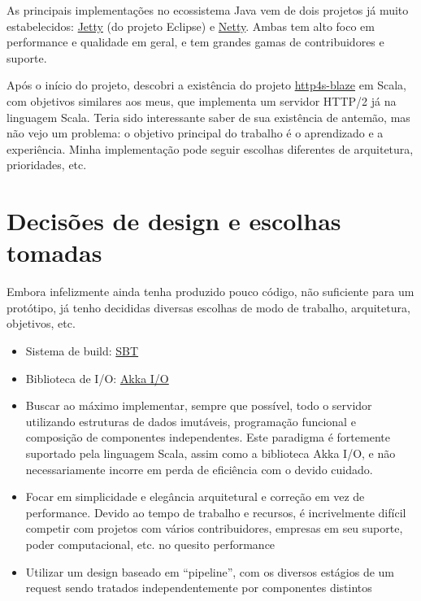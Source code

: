 \documentclass[12pt,a4paper,openright,twoside,]{abntex2}	%
\begin{document}
As principais implementações no ecossistema Java vem de dois projetos já
muito estabelecidos: \href{http://eclipse.org/jetty}{Jetty} (do projeto
Eclipse) e \href{http://netty.io}{Netty}. Ambas tem alto foco em
performance e qualidade em geral, e tem grandes gamas de contribuidores
e suporte.

Após o início do projeto, descobri a existência do projeto
\href{https://github.com/http4s/blaze}{http4s-blaze} em Scala, com
objetivos similares aos meus, que implementa um servidor HTTP/2 já na
linguagem Scala. Teria sido interessante saber de sua existência de
antemão, mas não vejo um problema: o objetivo principal do trabalho é o
aprendizado e a experiência. Minha implementação pode seguir escolhas
diferentes de arquitetura, prioridades, etc.

\section{Decisões de design e escolhas
tomadas}\label{decisuxf5es-de-design-e-escolhas-tomadas}

Embora infelizmente ainda tenha produzido pouco código, não suficiente
para um protótipo, já tenho decididas diversas escolhas de modo de
trabalho, arquitetura, objetivos, etc.

\begin{itemize}
\tightlist
\item
  Sistema de build: \href{http://scala-sbt.org/}{SBT}
\item
  Biblioteca de I/O:
  \href{http://doc.akka.io/docs/akka/current/scala/io.html}{Akka I/O}
\item
  Buscar ao máximo implementar, sempre que possível, todo o servidor
  utilizando estruturas de dados imutáveis, programação funcional e
  composição de componentes independentes. Este paradigma é fortemente
  suportado pela linguagem Scala, assim como a biblioteca Akka I/O, e
  não necessariamente incorre em perda de eficiência com o devido
  cuidado.
\item
  Focar em simplicidade e elegância arquitetural e correção em vez de
  performance. Devido ao tempo de trabalho e recursos, é incrivelmente
  difícil competir com projetos com vários contribuidores, empresas em
  seu suporte, poder computacional, etc. no quesito performance
\item
  Utilizar um design baseado em ``pipeline'', com os diversos estágios
  de um request sendo tratados independentemente por componentes
  distintos
\end{itemize}
\end{document}
